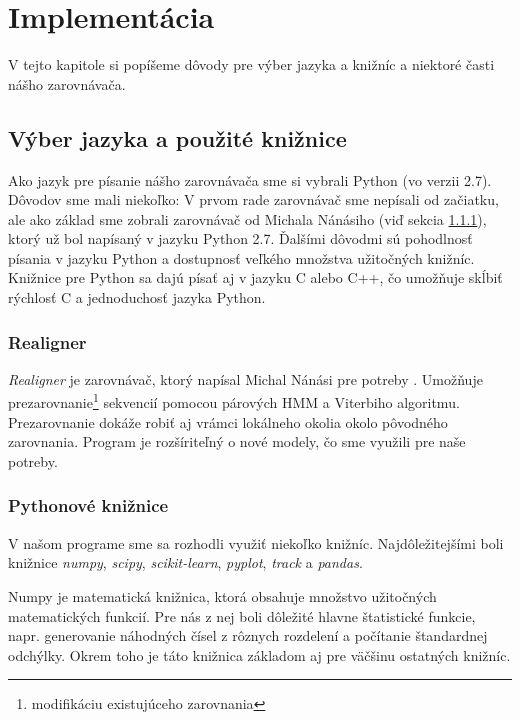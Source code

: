 \chapter{Implementácia}

V tejto kapitole si popíšeme dôvody pre výber jazyka a knižníc a niektoré časti nášho zarovnávača.

\section{Výber jazyka a použité knižnice}
Ako jazyk pre písanie nášho zarovnávača sme si vybrali Python (vo verzii 2.7). Dôvodov sme mali niekoľko: V prvom rade zarovnávač sme nepísali od začiatku, ale ako základ sme zobrali zarovnávač od Michala Nánásiho (viď sekcia \ref{subsec:realigner}), ktorý už bol napísaný v jazyku Python 2.7. Ďalšími dôvodmi sú pohodlnosť písania v jazyku Python a dostupnosť veľkého množstva užitočných knižníc. Knižnice pre Python sa dajú písať aj v jazyku C alebo C++, čo umožňuje skĺbiť rýchlosť C a jednoduchosť jazyka Python.

\subsection{Realigner}
\label{subsec:realigner}

\textit{Realigner} je zarovnávač, ktorý napísal Michal Nánási pre potreby \cite{nanasi2013probabilistic}. Umožňuje prezarovnanie\footnote{modifikáciu existujúceho zarovnania} sekvencií pomocou párových HMM a Viterbiho algoritmu. Prezarovnanie dokáže robiť aj vrámci lokálneho okolia okolo pôvodného zarovnania. Program je rozšíriteľný o nové modely, čo sme využili pre naše potreby.

\subsection{Pythonové knižnice}
V našom programe sme sa rozhodli využiť niekoľko knižníc. Najdôležitejšími boli knižnice \textit{numpy}, \textit{scipy}, \textit{scikit-learn}, \textit{pyplot}, \textit{track} a \textit{pandas}.

Numpy je matematická knižnica, ktorá obsahuje množstvo užitočných matematických funkcií. Pre nás z nej boli dôležité hlavne štatistické funkcie, napr. generovanie náhodných čísel z rôznych rozdelení a počítanie štandardnej odchýlky. Okrem toho je táto knižnica základom aj pre väčšinu ostatných knižníc.

